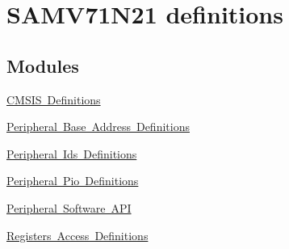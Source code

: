 \hypertarget{group__SAMV71N21__definitions}{}\section{S\+A\+M\+V71\+N21 definitions}
\label{group__SAMV71N21__definitions}
\subsection*{Modules}
\begin{DoxyCompactItemize}
\item 
\mbox{\hyperlink{group__SAMV71N21__cmsis}{C\+M\+S\+I\+S Definitions}}
\item 
\mbox{\hyperlink{group__SAMV71N21__base}{Peripheral Base Address Definitions}}
\item 
\mbox{\hyperlink{group__SAMV71N21__id}{Peripheral Ids Definitions}}
\item 
\mbox{\hyperlink{group__SAMV71N21__pio}{Peripheral Pio Definitions}}
\item 
\mbox{\hyperlink{group__SAMV71N21__api}{Peripheral Software A\+PI}}
\item 
\mbox{\hyperlink{group__SAMV71N21__reg}{Registers Access Definitions}}
\end{DoxyCompactItemize}
